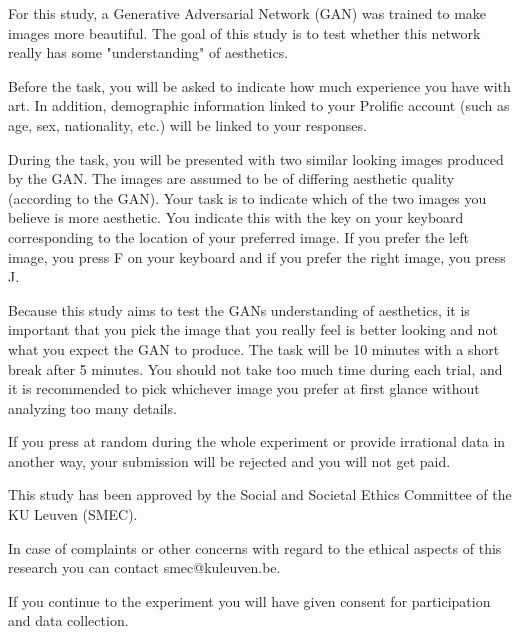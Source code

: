 \documentclass[../main.tex]{subfiles}
\begin{document}
\begin{flushleft}

For this study, a Generative Adversarial Network (GAN) was trained to make images more beautiful. The goal of this study is to test whether this network really has some "understanding" of aesthetics. \newline

Before the task, you will be asked to indicate how much experience you have with art. In addition, demographic information linked to your Prolific account (such as age, sex, nationality, etc.) will be linked to your responses.

During the task, you will be presented with two similar looking images produced by the GAN. The images are assumed to be of differing aesthetic quality (according to the GAN). Your task is to indicate which of the two images you believe is more aesthetic. You indicate this with the key on your keyboard corresponding to the location of your preferred image. If you prefer the left image, you press F on your keyboard and if you prefer the right image, you press J. \newline

Because this study aims to test the GANs understanding of aesthetics, it is important that you pick the image that you really feel is better looking and not what you expect the GAN to produce. The task will be 10 minutes with a short break after 5 minutes. You should not take too much time during each trial, and it is recommended to pick whichever image you prefer at first glance without analyzing too many details. \newline

If you press at random during the whole experiment or provide irrational data in another way, your submission will be rejected and you will not get paid. \newline

This study has been approved by the Social and Societal Ethics Committee of the KU Leuven (SMEC). \newline

In case of complaints or other concerns with regard to the ethical aspects of this research you can contact smec@kuleuven.be. \newline

If you continue to the experiment you will have given consent for participation and data collection.
\end{flushleft}
\end{document}
